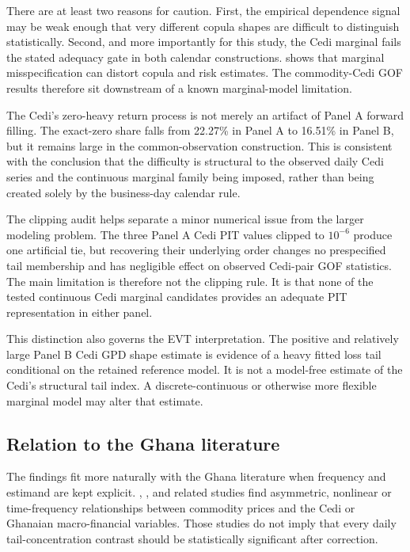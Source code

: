 There are at least two reasons for caution. First, the empirical dependence signal may be weak enough that very different copula shapes are difficult to distinguish statistically. Second, and more importantly for this study, the Cedi marginal fails the stated adequacy gate in both calendar constructions. \citet{fantazzini2009} shows that marginal misspecification can distort copula and risk estimates. The commodity-Cedi GOF results therefore sit downstream of a known marginal-model limitation.

The Cedi's zero-heavy return process is not merely an artifact of Panel A forward filling. The exact-zero share falls from 22.27\% in Panel A to 16.51\% in Panel B, but it remains large in the common-observation construction. This is consistent with the conclusion that the difficulty is structural to the observed daily Cedi series and the continuous marginal family being imposed, rather than being created solely by the business-day calendar rule.

The clipping audit helps separate a minor numerical issue from the larger modeling problem. The three Panel A Cedi PIT values clipped to \(10^{-6}\) produce one artificial tie, but recovering their underlying order changes no prespecified tail membership and has negligible effect on observed Cedi-pair GOF statistics. The main limitation is therefore not the clipping rule. It is that none of the tested continuous Cedi marginal candidates provides an adequate PIT representation in either panel.

This distinction also governs the EVT interpretation. The positive and relatively large Panel B Cedi GPD shape estimate is evidence of a heavy fitted loss tail conditional on the retained reference model. It is not a model-free estimate of the Cedi's structural tail index. A discrete-continuous or otherwise more flexible marginal model may alter that estimate.

\subsection{Relation to the Ghana literature}

The findings fit more naturally with the Ghana literature when frequency and estimand are kept explicit. \citet{archer2022}, \citet{barson2023}, \citet{yeboah2025} and related studies find asymmetric, nonlinear or time-frequency relationships between commodity prices and the Cedi or Ghanaian macro-financial variables. Those studies do not imply that every daily tail-concentration contrast should be statistically significant after correction.

